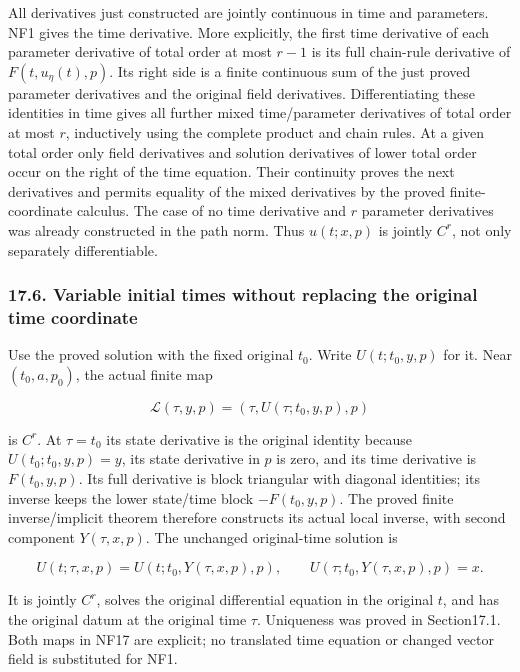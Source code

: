 \documentclass[
  11pt,
]{article}
\begin{document}
All derivatives just constructed are jointly continuous in time and
parameters. NF1 gives the time derivative. More explicitly, the first
time derivative of each parameter derivative of total order at most
\(r-1\) is its full chain-rule derivative of \(F(t,u_\eta(t),p)\). Its
right side is a finite continuous sum of the just proved parameter
derivatives and the original field derivatives. Differentiating these
identities in time gives all further mixed time/parameter derivatives of
total order at most \(r\), inductively using the complete product and
chain rules. At a given total order only field derivatives and solution
derivatives of lower total order occur on the right of the time
equation. Their continuity proves the next derivatives and permits
equality of the mixed derivatives by the proved finite-coordinate
calculus. The case of no time derivative and \(r\) parameter derivatives
was already constructed in the path norm. Thus \(u(t;x,p)\) is jointly
\(C^r\), not only separately differentiable.

\subsubsection{17.6. Variable initial times without replacing the
original time
coordinate}\label{variable-initial-times-without-replacing-the-original-time-coordinate}

Use the proved solution with the fixed original \(t_0\). Write
\(U(t;t_0,y,p)\) for it. Near \((t_0,a,p_0)\), the actual finite map

\[
 \mathcal L(\tau,y,p)
   =(\tau,U(\tau;t_0,y,p),p)
 \tag{NF16}
\]

is \(C^r\). At \(\tau=t_0\) its state derivative is the original
identity because \(U(t_0;t_0,y,p)=y\), its state derivative in \(p\) is
zero, and its time derivative is \(F(t_0,y,p)\). Its full derivative is
block triangular with diagonal identities; its inverse keeps the lower
state/time block \(-F(t_0,y,p)\). The proved finite inverse/implicit
theorem therefore constructs its actual local inverse, with second
component \(Y(\tau,x,p)\). The unchanged original-time solution is

\[
 U(t;\tau,x,p)=U(t;t_0,Y(\tau,x,p),p),\qquad
 U(\tau;t_0,Y(\tau,x,p),p)=x .
 \tag{NF17}
\]

It is jointly \(C^r\), solves the original differential equation in the
original \(t\), and has the original datum at the original time
\(\tau\). Uniqueness was proved in Section17.1. Both maps in NF17 are
explicit; no translated time equation or changed vector field is
substituted for NF1.
\end{document}
